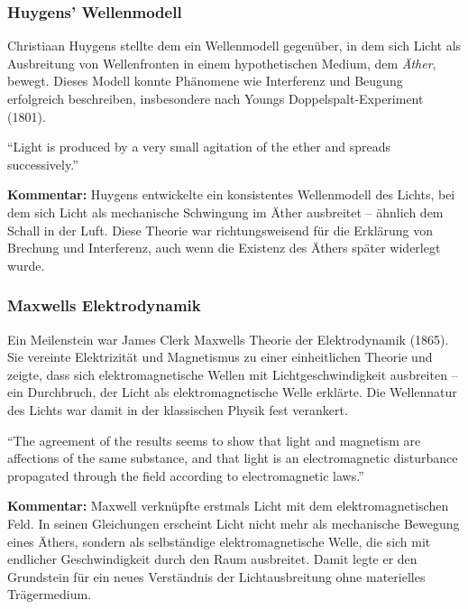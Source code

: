 \subsubsection{Huygens’ Wellenmodell}
Christiaan Huygens stellte dem ein Wellenmodell gegenüber, in dem sich Licht als Ausbreitung von Wellenfronten in einem hypothetischen Medium, dem \emph{Äther}, bewegt. Dieses Modell konnte Phänomene wie Interferenz und Beugung erfolgreich beschreiben, insbesondere nach Youngs Doppelspalt-Experiment (1801).
\medskip
\begin{tcolorbox}[physikbox, title={Huygens (1960) über Lichtausbreitung \cite{huygens_light}}]
	\label{box:huygens}
	“Light is produced by a very small agitation of the ether and spreads successively.”\\
	
	
	\medskip
	
	\textbf{Kommentar:} Huygens entwickelte ein konsistentes Wellenmodell des Lichts, bei dem sich Licht als mechanische Schwingung im Äther ausbreitet – ähnlich dem Schall in der Luft. Diese Theorie war richtungsweisend für die Erklärung von Brechung und Interferenz, auch wenn die Existenz des Äthers später widerlegt wurde.
\end{tcolorbox}
\medskip
{}
\newpage
\noindent
\subsubsection{Maxwells Elektrodynamik}
Ein Meilenstein war James Clerk Maxwells Theorie der Elektrodynamik (1865). Sie vereinte Elektrizität und Magnetismus zu einer einheitlichen Theorie und zeigte, dass sich elektromagnetische Wellen mit Lichtgeschwindigkeit ausbreiten – ein Durchbruch, der Licht als elektromagnetische Welle erklärte. Die Wellennatur des Lichts war damit in der klassischen Physik fest verankert.
	\medskip
\begin{tcolorbox}[physikbox,title={Maxwell (1873)über Licht und elektromagnetische Wellen \cite{maxwell_treatise}}]
	\label{box:maxwell}
	“The agreement of the results seems to show that light and magnetism are affections of the same substance, and that light is an electromagnetic disturbance propagated through the field according to electromagnetic laws.”\\
	
	
	\medskip
	
	\textbf{Kommentar:} Maxwell verknüpfte erstmals Licht mit dem elektromagnetischen Feld. In seinen Gleichungen erscheint Licht nicht mehr als mechanische Bewegung eines Äthers, sondern als selbständige elektromagnetische Welle, die sich mit endlicher Geschwindigkeit durch den Raum ausbreitet. Damit legte er den Grundstein für ein neues Verständnis der Lichtausbreitung ohne materielles Trägermedium.
\end{tcolorbox}

